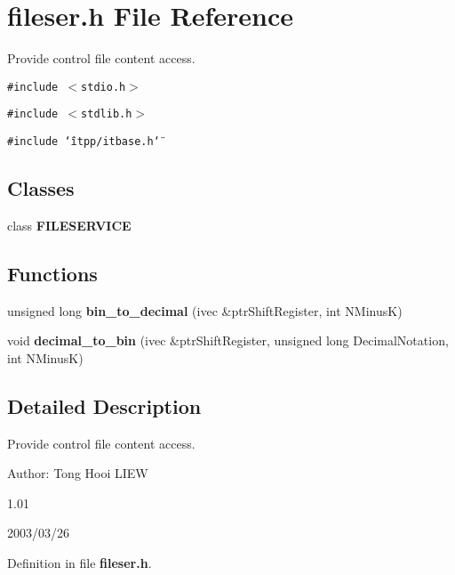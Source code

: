 \section{fileser.h File Reference}
\label{fileser_8h}
Provide control file content access. 

{\tt \#include $<$stdio.h$>$}\par
{\tt \#include $<$stdlib.h$>$}\par
{\tt \#include \char`\"{}itpp/itbase.h\char`\"{}}\par
\subsection*{Classes}
\begin{CompactItemize}
\item 
class {\bf FILESERVICE}
\end{CompactItemize}
\subsection*{Functions}
\begin{CompactItemize}
\item 
unsigned long {\bf bin\_\-to\_\-decimal} (ivec \&ptrShiftRegister, int NMinusK)\label{fileser_8h_1ae50cb72524a4f852b16a712e822983}

\item 
void {\bf decimal\_\-to\_\-bin} (ivec \&ptrShiftRegister, unsigned long DecimalNotation, int NMinusK)\label{fileser_8h_f15bf50e0cc7f853696b15db8611a69a}

\end{CompactItemize}


\subsection{Detailed Description}
Provide control file content access. 

\begin{Desc}
\item[Author:]Tong Hooi LIEW\end{Desc}
1.01

2003/03/26 

Definition in file {\bf fileser.h}.